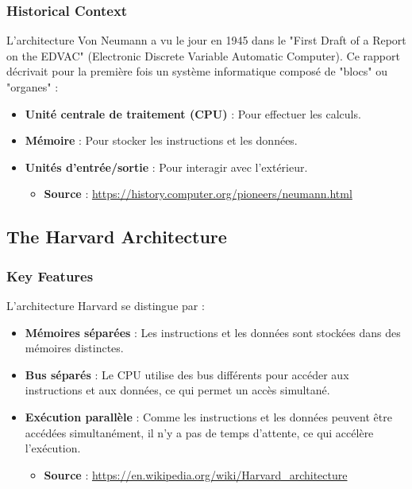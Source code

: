 \documentclass[10pt,a4paper]{article}
\begin{document}
\subsubsection*{Historical Context}
L'architecture Von Neumann a vu le jour en 1945 dans le "First Draft of a Report on the EDVAC" (Electronic Discrete Variable Automatic Computer). Ce rapport décrivait pour la première fois un système informatique composé de "blocs" ou "organes" :
\begin{itemize}
    \item \textbf{Unité centrale de traitement (CPU)} : Pour effectuer les calculs.
    \item \textbf{Mémoire} : Pour stocker les instructions et les données.
    \item \textbf{Unités d'entrée/sortie} : Pour interagir avec l'extérieur.
    \begin{itemize}
        \item \textbf{Source} : \url{https://history.computer.org/pioneers/neumann.html}
    \end{itemize}
\end{itemize}

\subsection*{The Harvard Architecture}

\subsubsection*{Key Features}
L'architecture Harvard se distingue par :
\begin{itemize}
    \item \textbf{Mémoires séparées} : Les instructions et les données sont stockées dans des mémoires distinctes.
    \item \textbf{Bus séparés} : Le CPU utilise des bus différents pour accéder aux instructions et aux données, ce qui permet un accès simultané.
    \item \textbf{Exécution parallèle} : Comme les instructions et les données peuvent être accédées simultanément, il n'y a pas de temps d'attente, ce qui accélère l'exécution.
    \begin{itemize}
        \item \textbf{Source} : \url{https://en.wikipedia.org/wiki/Harvard_architecture}
    \end{itemize}
\end{itemize}
\end{document}
